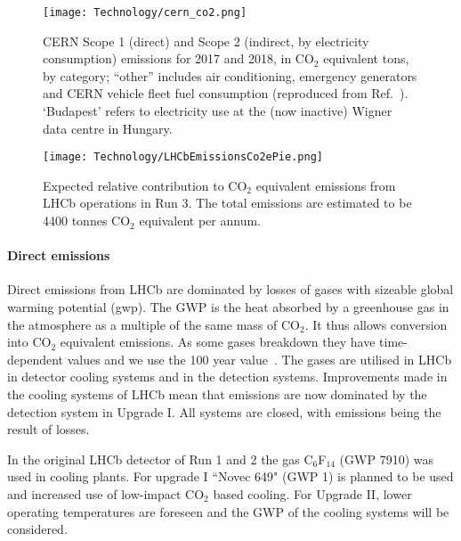 \documentclass[../SustainableHEP.tex]{subfiles}
\begin{document}
\begin{casestudy}
\begin{figure}
    \texttt{[image: Technology/cern\_co2.png]}
    \caption[CERN Scope 1 (direct) and Scope 2 (indirect, by electricity consumption) emissions for 2017 and 2018]{CERN Scope 1 (direct) and Scope 2 (indirect, by electricity consumption) emissions for 2017 and 2018, in CO$_2$ equivalent tons, by category; ``other'' includes air conditioning, emergency generators and CERN vehicle fleet fuel consumption (reproduced from Ref.~\cite{envrep2020}).  `Budapest' refers to electricity use at the (now inactive) Wigner data centre in Hungary.}\label{fig:cern_co2}
\end{figure}

\begin{figure}
    \texttt{[image: Technology/LHCbEmissionsCo2ePie.png]}
    \caption[Expected relative contribution to CO$_2$ equivalent emissions from LHCb operations in Run 3]{Expected relative contribution to CO$_2$ equivalent emissions from LHCb operations in Run 3. The total emissions are estimated to be 4400 tonnes CO$_2$ equivalent per annum.}\label{fig:lhcb_co2}
\end{figure}

\paragraph{Direct emissions}

Direct emissions from LHCb are dominated by losses of gases with sizeable global warming potential (\acrshort{gwp}). The GWP is the heat absorbed by a greenhouse gas in the atmosphere as a multiple of the same mass of CO$_2$.  It thus allows conversion into CO$_2$ equivalent emissions. As some gases breakdown they have time-dependent values and we use the 100 year value~\cite{AR5}. The gases are utilised in LHCb in detector cooling systems and in the detection systems. Improvements made in the cooling systems of LHCb mean that emissions are now dominated by the detection system in Upgrade I. All systems are closed, with emissions being the result of losses.

In the original LHCb detector of Run 1 and 2
the gas C$_6$F$_{14}$ (GWP 7910) was used in cooling plants. For upgrade I ``Novec 649" (GWP 1) is planned to be used and 
increased use of low-impact CO$_2$ based cooling.
For Upgrade II, lower operating temperatures are foreseen and the GWP of the cooling systems will be considered.


\end{casestudy}
\end{document}
